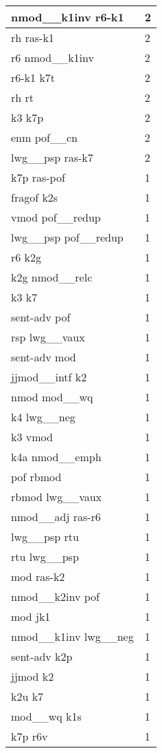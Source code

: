 \documentclass[a4 paper]{article}
\begin{document}
\begin{longtable}{p{}p{}}
nmod\_\_k1inv r6-k1  & 2 \\ \midrule
rh ras-k1  & 2 \\ \midrule
r6 nmod\_\_k1inv  & 2 \\ \midrule
r6-k1 k7t  & 2 \\ \midrule
rh rt  & 2 \\ \midrule
k3 k7p  & 2 \\ \midrule
enm pof\_\_cn  & 2 \\ \midrule
lwg\_\_psp ras-k7  & 2 \\ \midrule
k7p ras-pof  & 1 \\ \midrule
fragof k2s  & 1 \\ \midrule
vmod pof\_\_redup  & 1 \\ \midrule
lwg\_\_psp pof\_\_redup  & 1 \\ \midrule
r6 k2g  & 1 \\ \midrule
k2g nmod\_\_relc  & 1 \\ \midrule
k3 k7  & 1 \\ \midrule
sent-adv pof  & 1 \\ \midrule
rsp lwg\_\_vaux  & 1 \\ \midrule
sent-adv mod  & 1 \\ \midrule
jjmod\_\_intf k2  & 1 \\ \midrule
nmod mod\_\_wq  & 1 \\ \midrule
k4 lwg\_\_neg  & 1 \\ \midrule
k3 vmod  & 1 \\ \midrule
k4a nmod\_\_emph  & 1 \\ \midrule
pof rbmod  & 1 \\ \midrule
rbmod lwg\_\_vaux  & 1 \\ \midrule
nmod\_\_adj ras-r6  & 1 \\ \midrule
lwg\_\_psp rtu  & 1 \\ \midrule
rtu lwg\_\_psp  & 1 \\ \midrule
mod ras-k2  & 1 \\ \midrule
nmod\_\_k2inv pof  & 1 \\ \midrule
mod jk1  & 1 \\ \midrule
nmod\_\_k1inv lwg\_\_neg  & 1 \\ \midrule
sent-adv k2p  & 1 \\ \midrule
jjmod k2  & 1 \\ \midrule
k2u k7  & 1 \\ \midrule
mod\_\_wq k1s  & 1 \\ \midrule
k7p r6v  & 1 \\ \midrule

\end{longtable}
\end{document}
